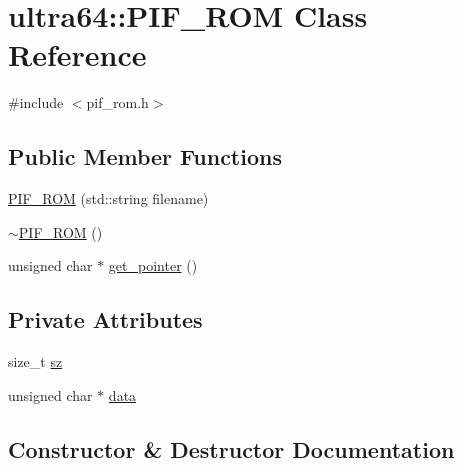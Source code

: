 \hypertarget{classultra64_1_1_p_i_f___r_o_m}{}\section{ultra64\+:\+:P\+I\+F\+\_\+\+R\+OM Class Reference}
\label{classultra64_1_1_p_i_f___r_o_m}


{\ttfamily \#include $<$pif\+\_\+rom.\+h$>$}

\subsection*{Public Member Functions}
\begin{DoxyCompactItemize}
\item 
\hyperlink{classultra64_1_1_p_i_f___r_o_m_a7e8eddb3e9b84a5ca103281cb19123f9}{P\+I\+F\+\_\+\+R\+OM} (std\+::string filename)
\item 
\hyperlink{classultra64_1_1_p_i_f___r_o_m_ac4b2741fd6bb8f8f6f776f35878b6b97}{$\sim$\+P\+I\+F\+\_\+\+R\+OM} ()
\item 
unsigned char $\ast$ \hyperlink{classultra64_1_1_p_i_f___r_o_m_a6b9b9df4a8ac59b54d11142148a54f24}{get\+\_\+pointer} ()
\end{DoxyCompactItemize}
\subsection*{Private Attributes}
\begin{DoxyCompactItemize}
\item 
size\+\_\+t \hyperlink{classultra64_1_1_p_i_f___r_o_m_a342b654cfe8680245be04377d10bba13}{sz}
\item 
unsigned char $\ast$ \hyperlink{classultra64_1_1_p_i_f___r_o_m_af6801323c87631a8a6c2563c85dc983b}{data}
\end{DoxyCompactItemize}


\subsection{Constructor \& Destructor Documentation}
\mbox{\label{classultra64_1_1_p_i_f___r_o_m_a7e8eddb3e9b84a5ca103281cb19123f9}} 
